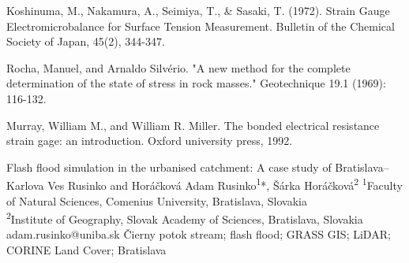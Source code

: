 {Koshinuma, M., Nakamura, A., Seimiya, T., \& Sasaki, T. (1972). Strain Gauge Electromicrobalance for Surface Tension Measurement. Bulletin of the Chemical Society of Japan, 45(2), 344-347.
	
Rocha, Manuel, and Arnaldo Silvério. "A new method for the complete determination of the state of stress in rock masses." Geotechnique 19.1 (1969): 116-132.

Murray, William M., and William R. Miller. The bonded electrical resistance strain gage: an introduction. Oxford university press, 1992.
}

\abstract
{Flash flood simulation in the urbanised catchment: A case study of Bratislava–Karlova Ves} %
{Rusinko and Horáčková} %
{Adam Rusinko\textsuperscript{1}*, Šárka Horáčková\textsuperscript{2}} %
{\POtag} %
{
	\textsuperscript{1}Faculty of Natural Sciences, Comenius University, Bratislava, Slovakia\\
	\textsuperscript{2}Institute of Geography, Slovak Academy of Sciences, Bratislava, Slovakia
} %
{adam.rusinko@uniba.sk}  %
{Čierny potok stream; flash flood; GRASS GIS; LiDAR; CORINE Land Cover; Bratislava}%
